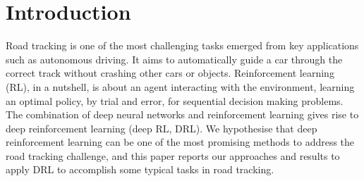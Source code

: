 \documentclass{svproc}
\begin{document}
	\section{Introduction}
	Road tracking is one of the most challenging tasks emerged from key applications such as autonomous driving. It aims to automatically guide a car through the correct track without crashing other cars or objects.  
	Reinforcement learning (RL), in a nutshell, is about an agent interacting with the environment, learning an optimal policy, by trial and error, for sequential decision making problems.
	The combination of deep neural networks and reinforcement learning gives rise to deep reinforcement learning (deep RL, DRL). We hypothesise that deep reinforcement learning %
	can be one of the most promising %
	methods %
	to address the road tracking challenge, and this paper %
	reports our approaches and results to apply DRL to accomplish some typical tasks in road tracking. 
	
\end{document}
